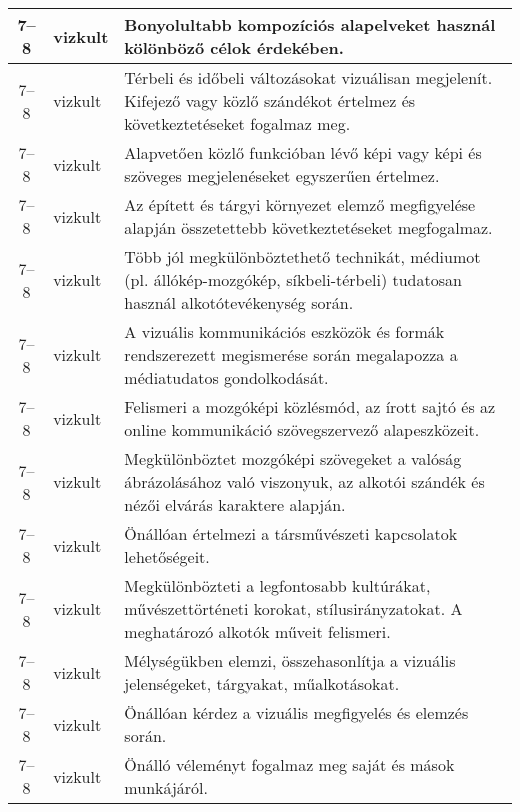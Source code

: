 \begin{small}
\begin{longtable}{c | p{2cm} |  p{11cm} }
              7--8 & vizkult & Bonyolultabb kompozíciós alapelveket használ kölönböző célok érdekében. \\ \hline
              7--8 & vizkult & Térbeli és időbeli változásokat vizuálisan megjelenít. Kifejező vagy közlő szándékot értelmez és következtetéseket fogalmaz meg. \\ \hline
              7--8 & vizkult & Alapvetően közlő funkcióban lévő képi vagy képi és szöveges megjelenéseket egyszerűen értelmez. \\ \hline
              7--8 & vizkult & Az épített és tárgyi környezet elemző megfigyelése alapján összetettebb következtetéseket megfogalmaz. \\ \hline
              7--8 & vizkult & Több jól megkülönböztethető technikát, médiumot (pl. állókép-mozgókép, síkbeli-térbeli) tudatosan használ alkotótevékenység során. \\ \hline
              7--8 & vizkult & A vizuális kommunikációs eszközök és formák rendszerezett megismerése során megalapozza a médiatudatos gondolkodását. \\ \hline
              7--8 & vizkult & Felismeri a mozgóképi közlésmód, az írott sajtó és az online kommunikáció szövegszervező alapeszközeit. \\ \hline
              7--8 & vizkult & Megkülönböztet mozgóképi szövegeket a valóság ábrázolásához való viszonyuk, az alkotói szándék és nézői elvárás karaktere alapján. \\ \hline
              7--8 & vizkult & Önállóan értelmezi a társművészeti kapcsolatok lehetőségeit. \\ \hline
              7--8 & vizkult & Megkülönbözteti a legfontosabb kultúrákat, művészettörténeti korokat, stílusirányzatokat. A meghatározó alkotók műveit felismeri. \\ \hline
              7--8 & vizkult & Mélységükben elemzi, összehasonlítja a vizuális jelenségeket, tárgyakat, műalkotásokat. \\ \hline
              7--8 & vizkult & Önállóan kérdez a vizuális megfigyelés és elemzés során. \\ \hline
              7--8 & vizkult & Önálló véleményt fogalmaz meg saját és mások munkájáról. \\ \hline
      \end{longtable}
\end{small}


